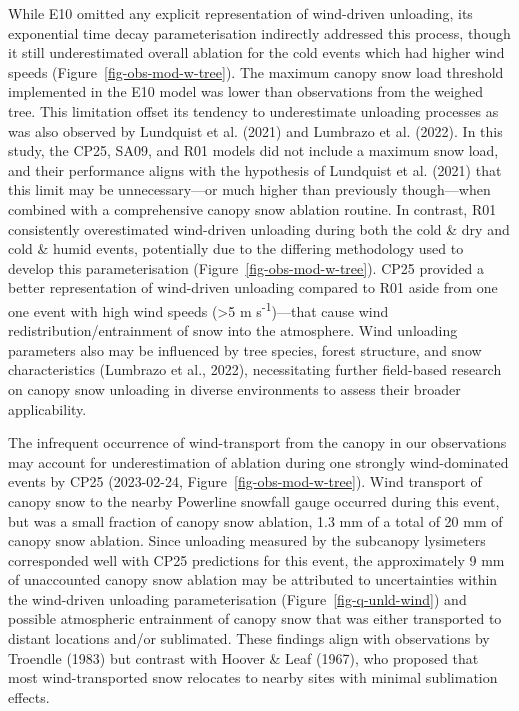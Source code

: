 \documentclass[
  letterpaper,
]{tex/uofsthesis-cs}
\begin{document}
While E10 omitted any explicit representation of wind-driven unloading,
its exponential time decay parameterisation indirectly addressed this
process, though it still underestimated overall ablation for the cold
events which had higher wind speeds (Figure~\ref{fig-obs-mod-w-tree}).
The maximum canopy snow load threshold implemented in the E10 model was
lower than observations from the weighed tree. This limitation offset
its tendency to underestimate unloading processes as was also observed
by Lundquist et al. (2021) and Lumbrazo et al. (2022). In this study,
the CP25, SA09, and R01 models did not include a maximum snow load, and
their performance aligns with the hypothesis of Lundquist et al. (2021)
that this limit may be unnecessary---or much higher than previously
though---when combined with a comprehensive canopy snow ablation
routine. In contrast, R01 consistently overestimated wind-driven
unloading during both the cold \& dry and cold \& humid events,
potentially due to the differing methodology used to develop this
parameterisation (Figure~\ref{fig-obs-mod-w-tree}). CP25 provided a
better representation of wind-driven unloading compared to R01 aside
from one one event with high wind speeds (\textgreater5 m
s\textsuperscript{-1})---that cause wind redistribution/entrainment of
snow into the atmosphere. Wind unloading parameters also may be
influenced by tree species, forest structure, and snow characteristics
(Lumbrazo et al., 2022), necessitating further field-based research on
canopy snow unloading in diverse environments to assess their broader
applicability.

The infrequent occurrence of wind-transport from the canopy in our
observations may account for underestimation of ablation during one
strongly wind-dominated events by CP25 (2023-02-24,
Figure~\ref{fig-obs-mod-w-tree}). Wind transport of canopy snow to the
nearby Powerline snowfall gauge occurred during this event, but was a
small fraction of canopy snow ablation, 1.3 mm of a total of 20 mm of
canopy snow ablation. Since unloading measured by the subcanopy
lysimeters corresponded well with CP25 predictions for this event, the
approximately 9 mm of unaccounted canopy snow ablation may be attributed
to uncertainties within the wind-driven unloading parameterisation
(Figure~\ref{fig-q-unld-wind}) and possible atmospheric entrainment of
canopy snow that was either transported to distant locations and/or
sublimated. These findings align with observations by Troendle (1983)
but contrast with Hoover \& Leaf (1967), who proposed that most
wind-transported snow relocates to nearby sites with minimal sublimation
effects.
\end{document}
